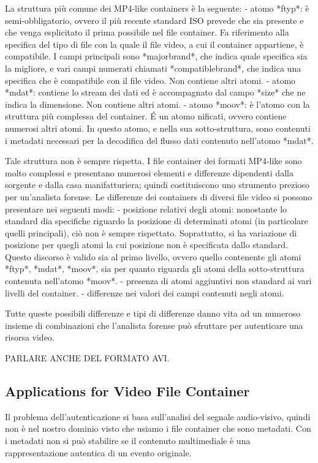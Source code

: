 La struttura più comune dei MP4-like containers è la seguente:
- atomo *ftyp*: è semi-obbligatorio, ovvero il più recente standard ISO prevede che sia presente e che venga esplicitato il prima possibile nel file container. Fa riferimento alla specifica del tipo di file con la quale il file video, a cui il container appartiene, è compatibile. I campi principali sono *majorbrand*, che indica quale specifica sia la migliore, e vari campi numerati chiamati *compatiblebrand*, che indica una specifica che è compatibile con il file video. Non contiene altri atomi.
- atomo *mdat*: contiene lo stream dei dati ed è accompagnato dal campo *size* che ne indica la dimensione. Non contiene altri atomi.
- atomo *moov*: è l'atomo con la struttura più complessa del container. É un atomo nificati, ovvero contiene numerosi altri atomi. In questo atomo, e nella sua sotto-struttura, sono contenuti i metadati necessari per la decodifica del flusso dati contenuto nell'atomo *mdat*.

Tale struttura non è sempre rispetta. I file container dei formati MP4-like sono molto complessi e presentano numerosi elementi e differenze dipendenti dalla sorgente e dalla casa manifatturiera; quindi costituiscono uno strumento prezioso per un'analista forense.
Le differenze dei containers di diversi file video si possono presentare nei seguenti modi:
- posizione relativi degli atomi: nonostante lo standard dia specifiche riguardo la posizione di determinati atomi (in particolare quelli principali), ciò non è sempre rispettato. Soprattutto, si ha variazione di posizione per quegli atomi la cui posizione non è specificata dallo standard. Questo discorso è valido sia al primo livello, ovvero quello contenente gli atomi *ftyp*, *mdat*, *moov*, sia per quanto riguarda gli atomi della sotto-struttura contenuta nell'atomo *moov*.
- presenza di atomi aggiuntivi non standard ai vari livelli del container.
- differenze nei valori dei campi contenuti negli atomi.

Tutte queste possibili differenze e tipi di differenze danno vita ad un numeroso insieme di combinazioni che l'analista forense può sfruttare per autenticare una risorsa video.

PARLARE ANCHE DEL FORMATO AVI.

\subsection{Applications for Video File Container}

Il problema dell'autenticazione si basa sull'analisi del segnale audio-visivo, quindi non è nel nostro dominio visto che usiamo i file container che sono metadati. Con i metadati non si può stabilire se il contenuto multimediale è una rappresentazione autentica di un evento originale.

